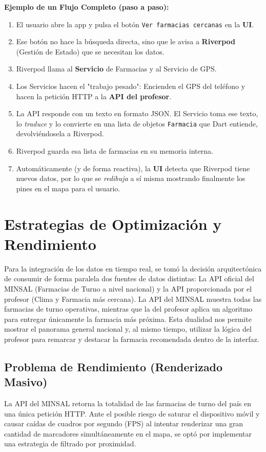 \documentclass[12pt,a4paper]{article}
\begin{document}
\textbf{Ejemplo de un Flujo Completo (paso a paso):}
\begin{enumerate}
    \item El usuario abre la app y pulsa el botón \texttt{Ver farmacias cercanas} en la \textbf{UI}.
    \item Ese botón no hace la búsqueda directa, sino que le avisa a \textbf{Riverpod} (Gestión de Estado) que se necesitan los datos.
    \item Riverpod llama al \textbf{Servicio} de Farmacias y al Servicio de GPS.
    \item Los Servicios hacen el "trabajo pesado": Encienden el GPS del teléfono y hacen la petición HTTP a la \textbf{API del profesor}.
    \item La API responde con un texto en formato JSON. El Servicio toma ese texto, lo \textit{traduce} y lo convierte en una lista de objetos \texttt{Farmacia} que Dart entiende, devolviéndosela a Riverpod.
    \item Riverpod guarda esa lista de farmacias en su memoria interna.
    \item Automáticamente (y de forma reactiva), la \textbf{UI} detecta que Riverpod tiene nuevos datos, por lo que se \textit{redibuja} a sí misma mostrando finalmente los pines en el mapa para el usuario.
\end{enumerate}


\section{Estrategias de Optimización y Rendimiento}

Para la integración de los datos en tiempo real, se tomó la decisión arquitectónica de consumir de forma paralela dos fuentes de datos distintas: La API oficial del MINSAL (Farmacias de Turno a nivel nacional) y la API proporcionada por el profesor (Clima y Farmacia más cercana). La API del MINSAL muestra todas las farmacias de turno operativas, mientras que la del profesor aplica un algoritmo para entregar únicamente la farmacia más próxima. Esta dualidad nos permite mostrar el panorama general nacional y, al mismo tiempo, utilizar la lógica del profesor para remarcar y destacar la farmacia recomendada dentro de la interfaz.

\subsection{Problema de Rendimiento (Renderizado Masivo)}
La API del MINSAL retorna la totalidad de las farmacias de turno del país en una única petición HTTP. Ante el posible riesgo de saturar el dispositivo móvil y causar caídas de cuadros por segundo (FPS) al intentar renderizar una gran cantidad de marcadores simultáneamente en el mapa, se optó por implementar una estrategia de filtrado por proximidad.
\end{document}
